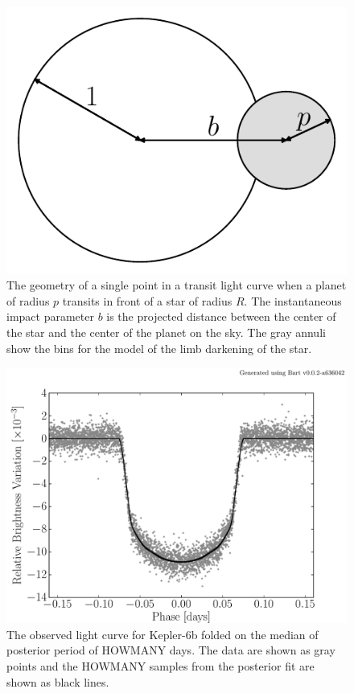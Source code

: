 \documentclass[12pt,preprint]{aastex}
\newcommand{\figlabel}[1]{\label{fig:#1}}
\begin{document}
\begin{figure}[htbp]
    \begin{center}
        \includegraphics[width=\textwidth]{figures/geom.pdf}
    \end{center}
    \caption{The geometry of a single point in a transit light curve when a
        planet of radius $p$ transits in front of a star of radius $R$. The
        instantaneous impact parameter $b$ is the projected distance between
        the center of the star and the center of the planet on the sky. The
        gray annuli show the bins for the model of the limb darkening of the
        star. \figlabel{geom}}
\end{figure}

\begin{figure}[htbp]
    \begin{center}
        \includegraphics[width=\textwidth]{figures/k6-lc.pdf}
    \end{center}
    \caption{The observed light curve for Kepler-6b folded on the median
        of posterior period of HOWMANY days. The data are shown as gray points
        and the HOWMANY samples from the posterior fit are shown as black
        lines. \figlabel{k6-lc}}
\end{figure}
\end{document}
